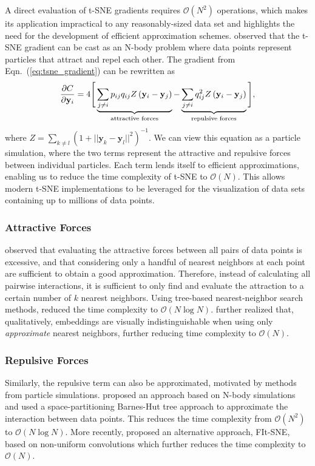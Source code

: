 \documentclass[article]{jss}
\begin{document}
A direct evaluation of t-SNE gradients requires $\mathcal{O}(N^2)$ operations,
which makes its application impractical to any reasonably-sized data set and
highlights the need for the development of efficient approximation schemes.
\citet{van2014accelerating} observed that the t-SNE gradient can be cast as an
N-body problem where data points represent particles that attract and repel each
other. The gradient from Eqn.~(\ref{eq:tsne_gradient}) can be rewritten as
\begin{equation}
\frac{\partial C}{\partial \mathbf{y}_i} = 4 \Bigg [
\underbrace{\sum_{j \neq i} p_{ij} q_{ij} Z \left ( \mathbf{y}_i - \mathbf{y}_j \right )}_{\text{attractive forces}}  -
\underbrace{\sum_{j \neq i} q_{ij}^2 Z \left ( \mathbf{y}_i - \mathbf{y}_j \right )}_{\text{repulsive forces}}
\Bigg ], \label{eq:grad_attr_rep} \notag
\end{equation}
where $Z = \sum_{k \neq l}\left ( 1 + || \mathbf{y}_k - \mathbf{y}_l ||^2 \right
)^{-1}$. We can view this equation as a particle simulation, where the
two terms represent the attractive and repulsive forces between individual
particles. Each term lends itself to efficient approximations, enabling us to
reduce the time complexity of t-SNE to $\mathcal{O}(N)$. This allows modern
t-SNE implementations to be leveraged for the visualization of data sets
containing up to millions of data points.

\subsubsection*{Attractive Forces}
\citet{van2014accelerating} observed that evaluating the attractive forces
between all pairs of data points is excessive, and that considering only a
handful of nearest neighbors at each point are sufficient to obtain a good
approximation. Therefore, instead of calculating all pairwise interactions, it
is sufficient to only find and evaluate the attraction to a certain number of
$k$ nearest neighbors. Using tree-based nearest-neighbor search methods,
\citet{van2014accelerating} reduced the time complexity to $\mathcal{O}(N \log
N)$. \citet{linderman2019fast} further realized that, qualitatively, embeddings
are visually indistinguishable when using only \textit{approximate} nearest
neighbors, further reducing time complexity to $\mathcal{O}(N)$.

\subsubsection*{Repulsive Forces}
Similarly, the repulsive term can also be approximated, motivated by methods from
particle simulations. \citet{van2014accelerating} proposed an approach based on
N-body simulations and used a space-partitioning Barnes-Hut tree approach to
approximate the interaction between data points. This reduces the time
complexity from $\mathcal{O}(N^2)$ to $\mathcal{O}(N \log N)$. More recently,
\citet{linderman2019fast} proposed an alternative approach, FIt-SNE, based on
non-uniform convolutions which further reduces the time complexity to
$\mathcal{O}(N)$.
\end{document}
